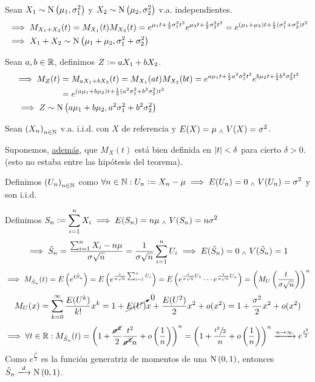 \begin{ejem}
	Sean $X_1\sim \operatorname{N}\left(\mu_1, \sigma_1^2\right)$ y $X_2\sim \operatorname{N}\left(\mu_2, \sigma_2^2\right)$ v.a. independientes.
	\[\begin{aligned}
			 & \implies M_{X_1+X_2}(t) = M_{X_1}(t)M_{X_2}(t) = e^{\mu_1t + \frac{1}{2}\sigma_1^2t^2}e^{\mu_2t + \frac{1}{2}\sigma_2^2t^2} = e^{(\mu_1+\mu_2)t + \frac{1}{2}(\sigma_1^2+\sigma_2^2)t^2} \\
			 & \implies X_1 + X_2 \sim \operatorname{N}\left(\mu_1+\mu_2, \sigma_1^2+\sigma_2^2\right)
		\end{aligned}\]

	Sean $a, b \in \mathbb{R}$, definimos $Z\vcentcolon= aX_1 + bX_2$.
	\[\begin{aligned}
			 & \begin{aligned}
				   \implies M_Z(t) & = M_{aX_1+bX_2}(t) = M_{X_1}(at)M_{X_2}(bt) = e^{a\mu_1t + \frac{1}{2}a^2\sigma_1^2t^2}e^{b\mu_2t + \frac{1}{2}b^2\sigma_2^2t^2} \\
				                   & = e^{(a\mu_1+b\mu_2)t + \frac{1}{2}(a^2\sigma_1^2+b^2\sigma_2^2)t^2}
			   \end{aligned} \\
			 & \implies Z \sim \operatorname{N}\left(a\mu_1+b\mu_2, a^2\sigma_1^2+b^2\sigma_2^2\right)
		\end{aligned}\]
\end{ejem}


\begin{dem}
	Sean $\left(X_n\right)_{n\in \mathbb{N}}$ v.a. i.i.d. con $X$ de referencia y $E(X) = \mu \; _{\wedge} \; V(X) = \sigma^2$.

	Suponemos, \underline{además}, que $M_X(t)$ está bien definida en $\left|t\right| < \delta$ para cierto $\delta > 0$. (esto no estaba entre las hipótesis del teorema).

	Definimos $\displaystyle \left(U_n\right)_{n\in \mathbb{N}}$ como $\displaystyle \forall n \in \mathbb{N} : U_n \vcentcolon= X_n - \mu \implies E(U_n) = 0 \; _{\wedge} \; V(U_n) = \sigma^2$ y son i.i.d.

	Definimos $\displaystyle S_n \vcentcolon= \sum_{i=1}^{n} X_i \implies E(S_n) = n\mu \; _{\wedge} \; V(S_n) = n\sigma^2$
	\[\implies \tilde{S}_n = \frac{\sum_{i=1}^{n} X_i - n\mu}{\sigma\sqrt{n}} = \frac{1}{\sigma\sqrt{n}}\sum_{i=1}^{n} U_i \implies E(\tilde{S}_n) = 0 \; _{\wedge} \; V(\tilde{S}_n) = 1\]
	\[\implies M_{\tilde{S}_n}(t) = E\left(e^{t\tilde{S}_n}\right) = E\left(e^{\frac{t}{\sigma\sqrt{n}}\sum_{i=1}^{n} U_i}\right) = E\left(e^{\frac{t}{\sigma\sqrt{n}}U_1} \cdots e^{\frac{t}{\sigma\sqrt{n}}U_n}\right) = \left(M_U\left(\frac{t}{\sigma\sqrt{n}}\right)\right)^n\]
	\[M_U(x) = \sum_{k=0}^{\infty} \frac{E(U^k)}{k!}x^k = 1 + \cancelto{0}{E(U)} x + \frac{E(U^2)}{2}x^2 + o(x^2) = 1 + \frac{\sigma^2}{2}x^2 + o(x^2)\]
	\[\implies \forall t \in \mathbb{R} : M_{\tilde{S}_n}(t) = \left(1 + \frac{\cancel{\sigma^2}}{2}\frac{t^2}{\cancel{\sigma^2}n} + o\left(\frac{1}{n}\right)\right)^n = \left(1 + \frac{\sfrac{t^2}{2}}{n} + o\left(\frac{1}{n}\right)\right)^n \xrightarrow{n\to\infty} e^{\frac{t^2}{2}}\]
	Como $e^{\frac{t^2}{2}}$ es la función generatriz de momentos de una $\operatorname{N}\left(0,1\right)$, entonces $\til{S}_n \xlongrightarrow{d} \normal{0,1}$.
\end{dem}

